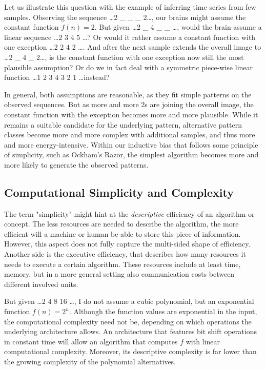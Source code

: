 Let us illustrate this question with the example of inferring time series from few samples.
Observing the sequence \dots 2 \_ \_ \_ 2\dots, our brains might assume the constant function $f(n)=2$.
But given \dots 2 \_ 4 \_ \_ \dots, would the brain assume a linear sequence \dots 2 3 4 5 \dots? Or would it rather assume a constant function with one exception \dots 2 2 4 2 \dots.
And after the next sample extends the overall image to \dots 2 \_ 4 \_ 2\dots, is the constant function with one exception now still the most plausible assumption?
Or do we in fact deal with a symmetric piece-wise linear function \dots 1 2 3 4 3 2 1 \dots instead?

In general, both assumptions are reasonable, as they fit simple patterns on the observed sequences.
But as more and more 2s are joining the overall image, the constant function with the exception becomes more and more plausible. While it remains a suitable candidate for the underlying pattern, alternative pattern classes become more and more complex with additional samples, and thus more and more energy-intensive. Within our inductive bias that follows some principle of simplicity, such as Ockham's Razor, the simplest algorithm becomes more and more likely to generate the observed patterns. 

\subsection{Computational Simplicity and Complexity}
The term "simplicity" might hint at the \textit{descriptive} efficiency of an algorithm or concept. The less resources are needed to describe the algorithm, the more efficient will a machine or human be able to store this piece of information. 
However, this aspect does not fully capture the multi-sided shape of efficiency. Another side is the executive efficiency, that describes how many resources it needs to execute a certain algorithm. These resources include at least time, memory, but in a more general setting also communication costs between different involved units.


But given \dots 2 4 8 16 \dots, I do not assume a cubic polynomial, but an exponential function $f(n)=2^n$. Although the function values are exponential in the input, the computational complexity need not be, depending on which operations the underlying architecture allows. An architecture that features bit shift operations in constant time will allow an algorithm that computes $f$ with linear computational complexity.
Moreover, its descriptive complexity is far lower than the growing complexity of the polynomial alternatives.


